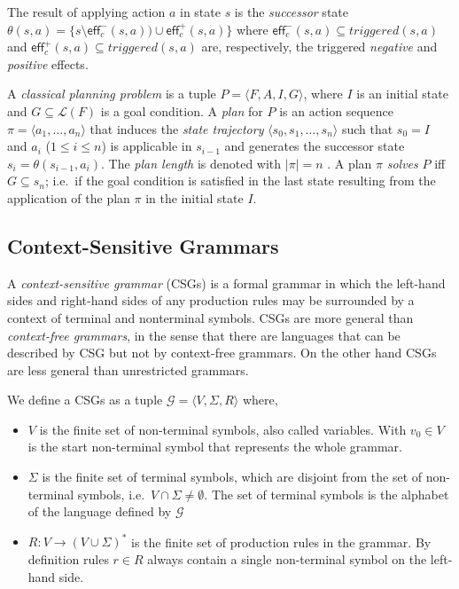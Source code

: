 \documentclass[letterpaper]{article} %
\newcommand{\tup}[1]{{\langle #1 \rangle}}
\newcommand{\eff}{\mathsf{eff}}     %
\begin{document}
The result of applying action $a$ in state $s$ is the {\em successor} state $\theta(s,a)=\{s\setminus\eff_c^-(s,a))\cup\eff_c^+(s,a)\}$ where $\eff_c^-(s,a)\subseteq triggered(s,a)$ and $\eff_c^+(s,a)\subseteq triggered(s,a)$ are, respectively, the triggered {\em negative} and {\em positive} effects.

A {\em classical planning problem} is a tuple $P=\tup{F,A,I,G}$, where $I$ is an initial state and $G\subseteq\mathcal{L}(F)$ is a goal condition. A {\em plan} for $P$ is an action sequence $\pi=\tup{a_1, \ldots, a_n}$ that induces the {\em state trajectory} $\tup{s_0, s_1, \ldots, s_n}$ such that $s_0=I$ and $a_i$ ({\small $1\leq i\leq n$}) is applicable in $s_{i-1}$ and generates the successor state $s_i=\theta(s_{i-1},a_i)$. The {\em plan length} is denoted with $|\pi|=n$ . A plan $\pi$ {\em solves} $P$ iff $G\subseteq s_n$; i.e.~if the goal condition is satisfied in the last state resulting from the application of the plan $\pi$ in the initial state $I$.

\subsection{Context-Sensitive Grammars}
A {\em context-sensitive grammar} (CSGs) is a formal grammar in which the left-hand sides and right-hand sides of any production rules may be surrounded by a context of terminal and nonterminal symbols. CSGs are more general than {\em context-free grammars}, in the sense that there are languages that can be described by CSG but not by context-free grammars. On the other hand CSGs are less general than unrestricted grammars.

We define a CSGs as a tuple $\mathcal{G}=\tup{V,\Sigma,R}$ where,
\begin{itemize}
\item $V$ is the finite set of non-terminal symbols, also called variables. With $v_0\in V$ is the start non-terminal symbol that represents the whole grammar.
\item $\Sigma$ is the finite set of terminal symbols, which are disjoint from the set of non-terminal symbols, i.e.~$V\cap \Sigma\neq\emptyset$. The set of terminal symbols is the alphabet of the language defined by $\mathcal{G}$
\item $R:V\rightarrow (V\cup \Sigma)^*$ is the finite set of production rules in the grammar. By definition rules $r\in R$ always contain a single non-terminal symbol on the left-hand side.
\end{itemize}
\end{document}
